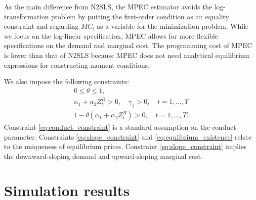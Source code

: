 \documentclass[11pt, a4paper]{article}
\begin{document}
As the main difference from N2SLS, the MPEC estimator avoids the log-transformation problem by putting the first-order condition as an equality constraint and regarding $MC_t$ as a variable for the minimization problem.
While we focus on the log-linear specification, MPEC allows for more flexible specifications on the demand and marginal cost.
The programming cost of MPEC is lower than that of N2SLS because MPEC does not need analytical equilibrium expressions for constructing moment conditions.

We also impose the following constraints:
\begin{align}
    &0\le\theta \le 1,\label{eq:conduct_constraint}\\
    &\alpha_1 + \alpha_2 Z_{t}^{R} >0, \quad \gamma_1>0 ,\quad t = 1,\ldots, T\label{eq:slope_constraint}\\
    &1- \theta(\alpha_1 + \alpha_2 Z_{t}^{R}) >0,\quad t = 1,\ldots, T.\label{eq:equlibrium_existence}
\end{align}
Constraint \eqref{eq:conduct_constraint} is a standard assumption on the conduct parameter.
Constraints \eqref{eq:slope_constraint} and \eqref{eq:equlibrium_existence} relate to the uniqueness of equilibrium prices. 
Constraint \eqref{eq:slope_constraint} implies the downward-sloping demand and upward-sloping marginal cost.








\section{Simulation results}\label{sec:results}
\end{document}
